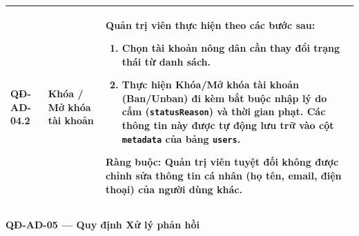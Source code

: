 \documentclass[12pt,a4paper]{article}
\begin{document}
\begin{longtable}{|
        >{\raggedright\arraybackslash}p{2.2cm}|
        >{\raggedright\arraybackslash}p{2.8cm}|
        >{\raggedright\arraybackslash}p{9.8cm}|}
    \hline
    \textbf{QĐ-AD-04.2}  & \textbf{Khóa / Mở khóa tài khoản} &
    Quản trị viên thực hiện theo các bước sau:
    \begin{enumerate}[leftmargin=*,topsep=2pt,itemsep=1pt]
        \item Chọn tài khoản nông dân cần thay đổi trạng thái từ danh sách.
        \item Thực hiện Khóa/Mở khóa tài khoản (Ban/Unban) đi kèm bắt buộc nhập lý do cấm (\texttt{statusReason}) và thời gian phạt. Các thông tin này được tự động lưu trữ vào cột \texttt{metadata} của bảng \texttt{users}.
    \end{enumerate}
    \textbf{Ràng buộc:} Quản trị viên tuyệt đối không được chỉnh sửa thông tin cá nhân (họ tên, email, điện thoại) của người dùng khác.                                                                                                                                                                                                                                             \\
    \hline
\end{longtable}

\vspace{0.3cm}
\noindent\textbf{QĐ-AD-05 --- Quy định Xử lý phản hồi}
\end{document}
